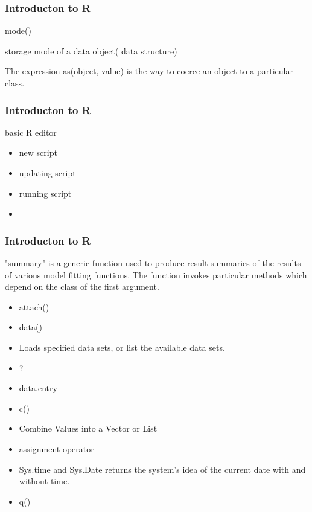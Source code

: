 \documentclass{beamer}
\begin{document}
\begin{frame}[fragile]
\frametitle{Introducton to R}


mode() \item  storage mode of a data object( data structure)

The expression as(object, value) is the way to coerce an object to a particular class. 


\end{frame}
\begin{frame}[fragile]
\frametitle{Introducton to R}


basic R editor
\begin{itemize}
 \item  new script
 \item  updating script
 \item  running script
 \item 
\end{itemize}

 
 
\end{frame}
\begin{frame}[fragile]
\frametitle{Introducton to R}

"summary" is a generic function used to produce result summaries of the results of various model fitting functions. 
The function invokes particular methods which depend on the class of the first argument. 

\begin{itemize}
  \item  attach()
  \item  data()
   \item  Loads specified data sets, or list the available data sets. 
  \item  ?
  \item  data.entry
  \item  c()
\item  Combine Values into a Vector or List
  \item  assignment operator
  \item  Sys.time and Sys.Date returns the system's idea of the current date with and without time. 
  \item  q()
  \end{itemize}

\end{frame}
\end{document}
